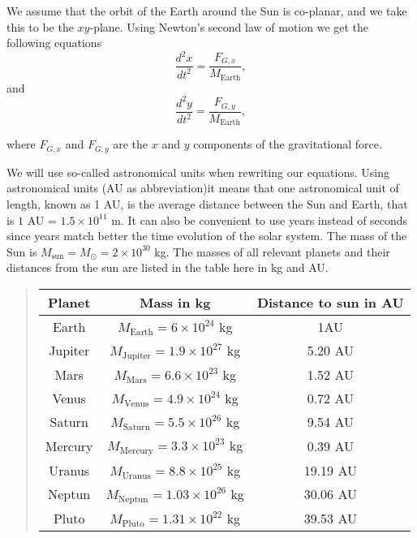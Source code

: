 \documentclass[%
oneside,                 %
final,                   %
10pt]{article}
\begin{document}
We assume that the orbit of the Earth around the Sun 
is co-planar, and we take this to be the $xy$-plane.
Using Newton's second law of motion we get the following equations
\[
\frac{d^2x}{dt^2}=\frac{F_{G,x}}{M_{\mathrm{Earth}}},
\]
and
\[
\frac{d^2y}{dt^2}=\frac{F_{G,y}}{M_{\mathrm{Earth}}},
\]

where $F_{G,x}$ and $F_{G,y}$ are the $x$ and $y$ components of the
gravitational force.

We will use so-called astronomical units when rewriting our equations.
Using astronomical units (AU as abbreviation)it means that one
astronomical unit of length, known as 1 AU, is the average distance
between the Sun and Earth, that is $1$ AU = $1.5\times 10^{11}$ m.  It
can also be convenient to use years instead of seconds since years
match better the time evolution of the solar system. The mass of the
Sun is $M_{\mathrm{sun}}=M_{\odot}=2\times 10^{30}$ kg. The masses of
all relevant planets and their distances from the sun are listed in
the table here in kg and AU.


\begin{quote}
\begin{tabular}{ccc}
\hline
\multicolumn{1}{c}{ Planet } & \multicolumn{1}{c}{ Mass in kg } & \multicolumn{1}{c}{ Distance to  sun in AU } \\
\hline
Earth   & $M_{\mathrm{Earth}}=6\times 10^{24}$ kg     & 1AU                    \\
Jupiter & $M_{\mathrm{Jupiter}}=1.9\times 10^{27}$ kg & 5.20 AU                \\
Mars    & $M_{\mathrm{Mars}}=6.6\times 10^{23}$ kg    & 1.52 AU                \\
Venus   & $M_{\mathrm{Venus}}=4.9\times 10^{24}$ kg   & 0.72 AU                \\
Saturn  & $M_{\mathrm{Saturn}}=5.5\times 10^{26}$ kg  & 9.54 AU                \\
Mercury & $M_{\mathrm{Mercury}}=3.3\times 10^{23}$ kg & 0.39 AU                \\
Uranus  & $M_{\mathrm{Uranus}}=8.8\times 10^{25}$ kg  & 19.19 AU               \\
Neptun  & $M_{\mathrm{Neptun}}=1.03\times 10^{26}$ kg & 30.06 AU               \\
Pluto   & $M_{\mathrm{Pluto}}=1.31\times 10^{22}$ kg  & 39.53 AU               \\
\hline
\end{tabular}
\end{quote}
\end{document}
